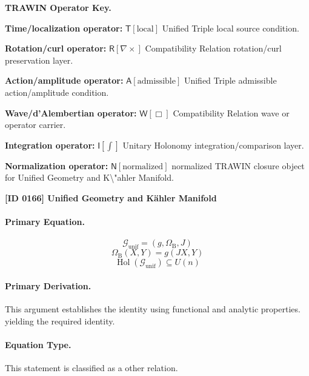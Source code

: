 \par\vspace{0.45\baselineskip}
\noindent\begin{minipage}[t]{\linewidth}
\begingroup
\small
\raggedright
\textbf{TRAWIN Operator Key.}\par
\noindent\textbf{Time/localization operator:} $\mathsf{T}\!\left[\mathrm{local}\right]$ Unified Triple local source condition.\par
\noindent\textbf{Rotation/curl operator:} $\mathsf{R}\!\left[\nabla\times\right]$ Compatibility Relation rotation/curl preservation layer.\par
\noindent\textbf{Action/amplitude operator:} $\mathsf{A}\!\left[\mathrm{admissible}\right]$ Unified Triple admissible action/amplitude condition.\par
\noindent\textbf{Wave/d'Alembertian operator:} $\mathsf{W}\!\left[\Box\right]$ Compatibility Relation wave or operator carrier.\par
\noindent\textbf{Integration operator:} $\mathsf{I}\!\left[\int\right]$ Unitary Holonomy integration/comparison layer.\par
\noindent\textbf{Normalization operator:} $\mathsf{N}\!\left[\mathrm{normalized}\right]$ normalized TRAWIN closure object for Unified Geometry and K\textbackslash{}"ahler Manifold.\par
\endgroup
\end{minipage}

\clearpage
\noindent\textbf{[ID 0166] Unified Geometry and K\"ahler Manifold}\par
\vspace{0.35em}
\paragraph{Primary Equation.}
\[
\mathcal{G}_{\mathrm{unif}}=(g,\Omega_{\mathrm{B}},J)
\]
\[
\Omega_{\mathrm{B}}(X,Y)=g(JX,Y)
\]
\[
\operatorname{Hol}(\mathcal{G}_{\mathrm{unif}})\subseteq U(n)
\]

\paragraph{Primary Derivation.}
This argument establishes the identity using functional and analytic properties. yielding the required identity.
\paragraph{Equation Type.}
This statement is classified as a other relation.

